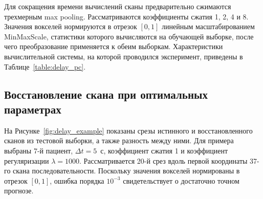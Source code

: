 Для сокращения времени вычислений сканы предварительно сжимаются трехмерным max pooling. Рассматриваются коэффициенты сжатия 1, 2, 4 и 8. Значения вокселей нормируются в отрезок $[0, 1]$ линейным масштабированием MinMaxScale, статистики которого вычисляются на обучающей выборке, после чего преобразование применяется к обеим выборкам. Характеристики вычислительной системы, на которой проводился эксперимент, приведены в Таблице~\ref{table:delay_pc}.

\begin{table}[h!]
    \centering
    \caption{Характеристики вычислительной системы}\label{table:delay_pc}
\end{table}

\subsection{Восстановление скана при оптимальных параметрах}\label{sec4:delay_example}

На Рисунке~\ref{fig:delay_example} показаны срезы истинного и восстановленного сканов из тестовой выборки, а также разность между ними. Для примера выбраны 7-й пациент, $\Delta t = 5$~с, коэффициент сжатия 1 и коэффициент регуляризации $\lambda = 1000$. Рассматривается 20-й срез вдоль первой координаты 37-го скана последовательности. Поскольку значения вокселей нормированы в отрезок $[0, 1]$, ошибка порядка $10^{-3}$ свидетельствует о достаточно точном прогнозе.

